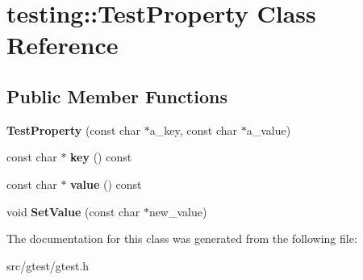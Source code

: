 \hypertarget{classtesting_1_1_test_property}{}\section{testing\+:\+:Test\+Property Class Reference}
\label{classtesting_1_1_test_property}
\subsection*{Public Member Functions}
\begin{DoxyCompactItemize}
\item 
\mbox{\label{classtesting_1_1_test_property_a2ebe8f9312fe2aa2e438f7d061d0be61}} 
{\bfseries Test\+Property} (const char $\ast$a\+\_\+key, const char $\ast$a\+\_\+value)
\item 
\mbox{\label{classtesting_1_1_test_property_ad60435d4ad04ac030487d8998fc61c5f}} 
const char $\ast$ {\bfseries key} () const
\item 
\mbox{\label{classtesting_1_1_test_property_ad423a07af33c88b0c9ed33ee74815a63}} 
const char $\ast$ {\bfseries value} () const
\item 
\mbox{\label{classtesting_1_1_test_property_acda79bfc4f3b3acc833d35b03eac10ba}} 
void {\bfseries Set\+Value} (const char $\ast$new\+\_\+value)
\end{DoxyCompactItemize}


The documentation for this class was generated from the following file\+:\begin{DoxyCompactItemize}
\item 
src/gtest/gtest.\+h\end{DoxyCompactItemize}
